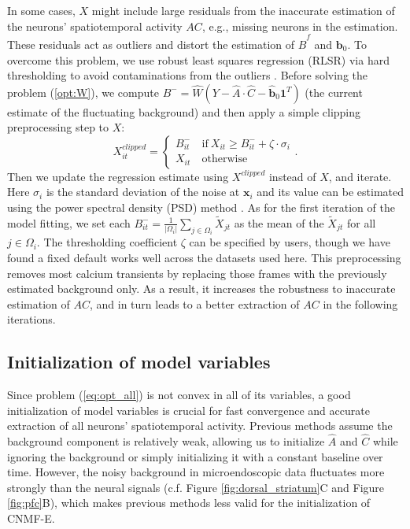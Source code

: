 \documentclass[9pt,lineno]{elife}
\begin{document}
In some cases, $X$ might include large residuals from the inaccurate estimation of the neurons' spatiotemporal activity $AC$, e.g., missing neurons in the estimation. These residuals act as outliers and distort the estimation of $\hat{B}^f$ and $\bm{b}_0$. To overcome this problem, we use robust least squares regression (RLSR) via hard thresholding to avoid contaminations from the outliers \citep{bhatia2015robust}. Before solving the problem (\ref{opt:W}), we compute $B^-=\hat{W}(Y-\hat{A}\cdot \hat{C}-\hat{\bm{b}}_0 \bm{1}^T)$ (the current estimate of the fluctuating background) and then apply a simple clipping preprocessing step to $X$:
\begin{equation}
  {X}_{it}^{clipped} = \left\{\begin{matrix}
B_{it}^-& ~ \text{if}~ X_{it}\geq B_{it}^-+\zeta\cdot \sigma_i\\ 
X_{it}& ~ \text{otherwise}
\end{matrix}\right..
\end{equation}
Then we update the regression estimate using $X^{clipped}$ instead of $X$, and iterate.
Here $\sigma_i$ is the standard deviation of the noise at $\bm{x}_i$ and its value can be estimated using the power spectral density (PSD) method \citep{Pnevmatikakis2016}. As for the first iteration of the model fitting, we set each $B_{it}^-=\frac{1}{|\Omega_i|}\sum_{j\in\Omega_i}\tilde{X}_{jt}$ as the mean of the $\tilde{X}_{jt}$ for all $j\in \Omega_i$. The thresholding coefficient $\zeta$ can be specified by users, though we have found a fixed default works well across the datasets used here. This preprocessing removes most calcium transients by replacing those frames with the previously estimated background only. As a result, it increases the robustness to inaccurate estimation of $AC$, and in turn leads to a better extraction of $AC$ in the following iterations. %

\subsection{Initialization of model variables} 

Since problem (\ref{eq:opt_all}) is not  convex in all of its variables, a good initialization of model variables is crucial for fast convergence and accurate extraction of all neurons' spatiotemporal activity. Previous methods assume the background component is relatively weak, allowing us to initialize $\hat{A}$ and $\hat{C}$ while ignoring the background or simply initializing it with a constant baseline over time. However, the noisy background in microendoscopic data fluctuates more strongly than the neural signals (c.f. Figure \ref{fig:dorsal_striatum}C and Figure \ref{fig:pfc}B), which makes previous methods  less valid for the initialization of CNMF-E. 
\end{document}
